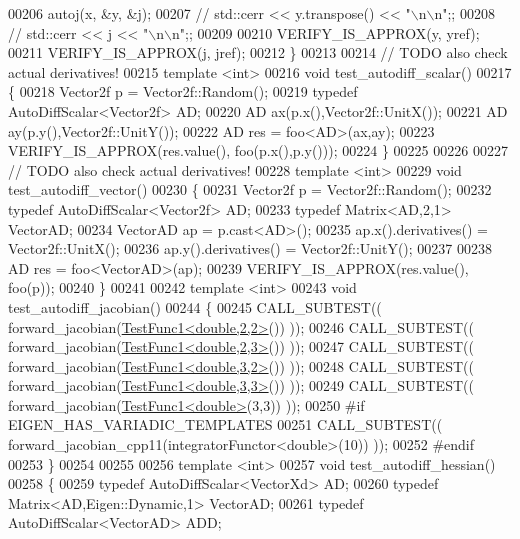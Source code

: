 \begin{DoxyCode}
00206     autoj(x, &y, &j);
00207 \textcolor{comment}{//     std::cerr << y.transpose() << "\(\backslash\)n\(\backslash\)n";;}
00208 \textcolor{comment}{//     std::cerr << j << "\(\backslash\)n\(\backslash\)n";;}
00209 
00210     VERIFY\_IS\_APPROX(y, yref);
00211     VERIFY\_IS\_APPROX(j, jref);
00212 \}
00213 
00214 \textcolor{comment}{// TODO also check actual derivatives!}
00215 \textcolor{keyword}{template} <\textcolor{keywordtype}{int}>
00216 \textcolor{keywordtype}{void} test\_autodiff\_scalar()
00217 \{
00218   Vector2f p = Vector2f::Random();
00219   \textcolor{keyword}{typedef} AutoDiffScalar<Vector2f> AD;
00220   AD ax(p.x(),Vector2f::UnitX());
00221   AD ay(p.y(),Vector2f::UnitY());
00222   AD res = foo<AD>(ax,ay);
00223   VERIFY\_IS\_APPROX(res.value(), foo(p.x(),p.y()));
00224 \}
00225 
00226 
00227 \textcolor{comment}{// TODO also check actual derivatives!}
00228 \textcolor{keyword}{template} <\textcolor{keywordtype}{int}>
00229 \textcolor{keywordtype}{void} test\_autodiff\_vector()
00230 \{
00231   Vector2f p = Vector2f::Random();
00232   \textcolor{keyword}{typedef} AutoDiffScalar<Vector2f> AD;
00233   \textcolor{keyword}{typedef} Matrix<AD,2,1> VectorAD;
00234   VectorAD ap = p.cast<AD>();
00235   ap.x().derivatives() = Vector2f::UnitX();
00236   ap.y().derivatives() = Vector2f::UnitY();
00237 
00238   AD res = foo<VectorAD>(ap);
00239   VERIFY\_IS\_APPROX(res.value(), foo(p));
00240 \}
00241 
00242 \textcolor{keyword}{template} <\textcolor{keywordtype}{int}>
00243 \textcolor{keywordtype}{void} test\_autodiff\_jacobian()
00244 \{
00245   CALL\_SUBTEST(( forward\_jacobian(\hyperlink{struct_test_func1}{TestFunc1<double,2,2>}()) ));
00246   CALL\_SUBTEST(( forward\_jacobian(\hyperlink{struct_test_func1}{TestFunc1<double,2,3>}()) ));
00247   CALL\_SUBTEST(( forward\_jacobian(\hyperlink{struct_test_func1}{TestFunc1<double,3,2>}()) ));
00248   CALL\_SUBTEST(( forward\_jacobian(\hyperlink{struct_test_func1}{TestFunc1<double,3,3>}()) ));
00249   CALL\_SUBTEST(( forward\_jacobian(\hyperlink{struct_test_func1}{TestFunc1<double>}(3,3)) ));
00250 \textcolor{preprocessor}{#if EIGEN\_HAS\_VARIADIC\_TEMPLATES}
00251   CALL\_SUBTEST(( forward\_jacobian\_cpp11(integratorFunctor<double>(10)) ));
00252 \textcolor{preprocessor}{#endif}
00253 \}
00254 
00255 
00256 \textcolor{keyword}{template} <\textcolor{keywordtype}{int}>
00257 \textcolor{keywordtype}{void} test\_autodiff\_hessian()
00258 \{
00259   \textcolor{keyword}{typedef} AutoDiffScalar<VectorXd> AD;
00260   \textcolor{keyword}{typedef} Matrix<AD,Eigen::Dynamic,1> VectorAD;
00261   \textcolor{keyword}{typedef} AutoDiffScalar<VectorAD> ADD;

\end{DoxyCode}
